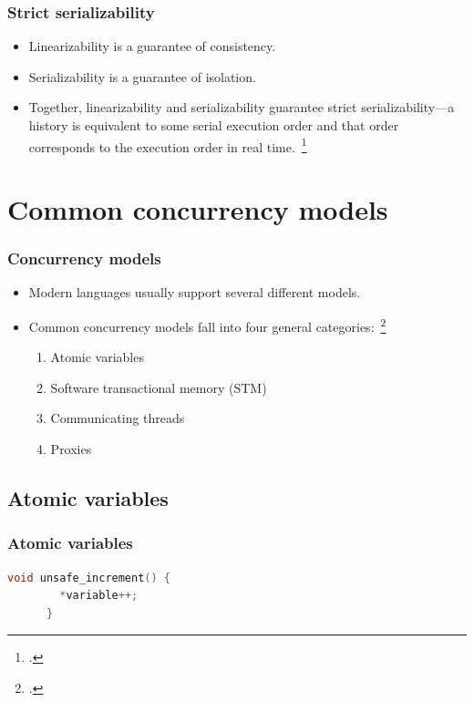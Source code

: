 \documentclass{beamer}
\begin{document}
  \begin{frame}
    \frametitle{Strict serializability}

    \begin{itemize}
      \item Linearizability is a guarantee of consistency.
      \item Serializability is a guarantee of isolation.
      \item Together, linearizability and serializability guarantee strict serializability---a history is equivalent to some serial execution order and that order corresponds to the execution order in real time.~\footcite{Herlihy1990}
    \end{itemize}
  \end{frame}

  \section{Common concurrency models}

  \begin{frame}
    \frametitle{Concurrency models}

    \begin{itemize}
      \item Modern languages usually support several different models.
      \item Common concurrency models fall into four general categories:~\footcite{Swalens2014}
      \begin{enumerate}
        \item Atomic variables
        \item Software transactional memory (STM)
        \item Communicating threads
        \item Proxies
      \end{enumerate}
    \end{itemize}
  \end{frame}

  \subsection{Atomic variables}

  \begin{frame}[fragile]
    \frametitle{Atomic variables}

    \begin{lstlisting}[basicstyle=\scriptsize\ttfamily,language=C]
      void unsafe_increment() {
        *variable++;
      }
    \end{lstlisting}
\end{frame}
\end{document}
